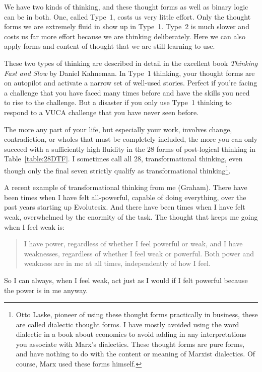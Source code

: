 We have two kinds of thinking, and these thought forms as well as binary logic can be in both. One, called Type~1, costs us very little effort. Only the thought forms we are extremely fluid in show up in Type~1. Type~2 is much slower and costs us far more effort because we are thinking deliberately. Here we can also apply forms and content of thought that we are still learning to use. 


These two types of thinking are described in detail in the excellent book \emph{Thinking Fast and Slow} by Daniel Kahneman\cite{kahneman-thinking}. In Type~1 thinking, your thought forms are on autopilot and activate a narrow set of well-used stories. Perfect if you're facing a challenge that you have faced many times before and have the skills you need to rise to the challenge. But a disaster if you only use Type~1 thinking to respond to a VUCA challenge that you have never seen before.


The more any part of your life, but especially your work, involves change, contradiction, or wholes that must be completely included, the more you can only succeed with a sufficiently high fluidity in the 28 forms of post-logical thinking in Table~\ref{table:28DTF}. I sometimes call all 28, transformational thinking, even though only the final seven strictly qualify as transformational thinking\footnote{Otto Laske, pioneer of using these thought forms practically in business, these are called dialectic thought forms. I have mostly avoided using the word dialectic in a book about economics to avoid adding in any interpretations you associate with Marx's dialectics.  These thought forms are pure forms, and have nothing to do with the content or meaning of Marxist dialectics. Of course, Marx used these forms himself.}.


A recent example of transformational thinking from me (Graham). There have been times when I have felt all-powerful, capable of doing everything, over the past years starting up Evolutesix. And there have been times when I have felt weak, overwhelmed by the enormity of the task. The thought that keeps me going when I feel weak is: 
\begin{quote}
I have power, regardless of whether I feel powerful or weak, and I have weaknesses, regardless of whether I feel weak or powerful. Both power and weakness are in me at all times, independently of how I feel.
\end{quote}
So I can always, when I feel weak, act just as I would if I felt powerful because the power is in me anyway.


